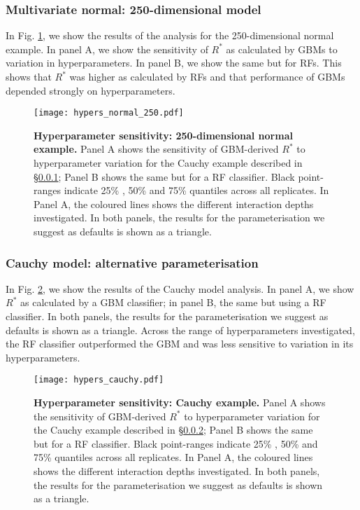\documentclass{article}
\begin{document}
\subsubsection{Multivariate normal: 250-dimensional model}\label{sec:hyperparameters_normal}
In Fig. \ref{fig:hypers_normal}, we show the results of the analysis for the 250-dimensional normal example. In panel A, we show the sensitivity of $R^*$ as calculated by GBMs to variation in hyperparameters. In panel B, we show the same but for RFs. This shows that $R^*$ was higher as calculated by RFs and that performance of GBMs depended strongly on hyperparameters.

\begin{figure}[!htb]
	\centerline{\texttt{[image: hypers\_normal\_250.pdf]}}
	\caption{\textbf{Hyperparameter sensitivity: 250-dimensional normal example.} Panel A shows the sensitivity of GBM-derived $R^*$ to hyperparameter variation for the Cauchy example described in \S\ref{sec:hyperparameters_normal}; Panel B shows the same but for a RF classifier. Black point-ranges indicate 25\% , 50\% and 75\% quantiles across all replicates. In Panel A, the coloured lines shows the different interaction depths investigated. In both panels, the results for the parameterisation we suggest as defaults is shown as a triangle.}
	\label{fig:hypers_normal}
\end{figure}


\subsubsection{Cauchy model: alternative parameterisation}\label{sec:hyperparameters_cauchy}
In Fig. \ref{fig:hypers_cauchy}, we show the results of the Cauchy model analysis. In panel A, we show $R^*$ as calculated by a GBM classifier; in panel B, the same but using a RF classifier. In both panels, the results for the parameterisation we suggest as defaults is shown as a triangle. Across the range of hyperparameters investigated, the RF classifier outperformed the GBM and was less sensitive to variation in its hyperparameters.

\begin{figure}[!htb]
	\centerline{\texttt{[image: hypers\_cauchy.pdf]}}
	\caption{\textbf{Hyperparameter sensitivity: Cauchy example.} Panel A shows the sensitivity of GBM-derived $R^*$ to hyperparameter variation for the Cauchy example described in \S\ref{sec:hyperparameters_cauchy}; Panel B shows the same but for a RF classifier. Black point-ranges indicate 25\% , 50\% and 75\% quantiles across all replicates. In Panel A, the coloured lines shows the different interaction depths investigated. In both panels, the results for the parameterisation we suggest as defaults is shown as a triangle.}
	\label{fig:hypers_cauchy}
\end{figure}
\end{document}
